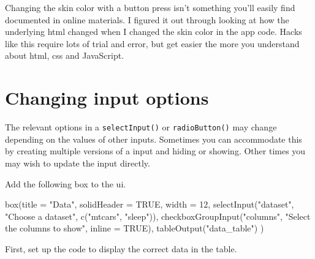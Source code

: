 \documentclass[
  oneside]{book}
\newenvironment{Shaded}{\begin{snugshade}}{\end{snugshade}}
\newcommand{\AttributeTok}[1]{\textcolor[rgb]{0.77,0.63,0.00}{#1}}
\newcommand{\ConstantTok}[1]{\textcolor[rgb]{0.00,0.00,0.00}{#1}}
\newcommand{\DecValTok}[1]{\textcolor[rgb]{0.00,0.00,0.81}{#1}}
\newcommand{\FunctionTok}[1]{\textcolor[rgb]{0.00,0.00,0.00}{#1}}
\newcommand{\NormalTok}[1]{#1}
\newcommand{\OtherTok}[1]{\textcolor[rgb]{0.56,0.35,0.01}{#1}}
\newcommand{\SpecialCharTok}[1]{\textcolor[rgb]{0.00,0.00,0.00}{#1}}
\newcommand{\StringTok}[1]{\textcolor[rgb]{0.31,0.60,0.02}{#1}}
\begin{document}
\begin{info}
Changing the skin color with a button press isn't something you'll easily find documented in online materials. I figured it out through looking at how the underlying html changed when I changed the skin color in the app code. Hacks like this require lots of trial and error, but get easier the more you understand about html, css and JavaScript.

\end{info}

\hypertarget{changing-input-options}{%
\section{Changing input options}\label{changing-input-options}}

The relevant options in a \texttt{selectInput}\texttt{()} or \texttt{radioButton}\texttt{()} may change depending on the values of other inputs. Sometimes you can accommodate this by creating multiple versions of a input and hiding or showing. Other times you may wish to update the input directly.

Add the following box to the ui.

\begin{Shaded}
\begin{Highlighting}[]
\FunctionTok{box}\NormalTok{(}\AttributeTok{title =} \StringTok{"Data"}\NormalTok{, }\AttributeTok{solidHeader =} \ConstantTok{TRUE}\NormalTok{, }\AttributeTok{width =} \DecValTok{12}\NormalTok{,}
  \FunctionTok{selectInput}\NormalTok{(}\StringTok{"dataset"}\NormalTok{, }\StringTok{"Choose a dataset"}\NormalTok{, }\FunctionTok{c}\NormalTok{(}\StringTok{"mtcars"}\NormalTok{, }\StringTok{"sleep"}\NormalTok{)),}
  \FunctionTok{checkboxGroupInput}\NormalTok{(}\StringTok{"columns"}\NormalTok{, }\StringTok{"Select the columns to show"}\NormalTok{, }\AttributeTok{inline =} \ConstantTok{TRUE}\NormalTok{),}
  \FunctionTok{tableOutput}\NormalTok{(}\StringTok{"data\_table"}\NormalTok{)}
\NormalTok{)}
\end{Highlighting}
\end{Shaded}

First, set up the code to display the correct data in the table.

\begin{Shaded}
\end{Shaded}
\end{document}
